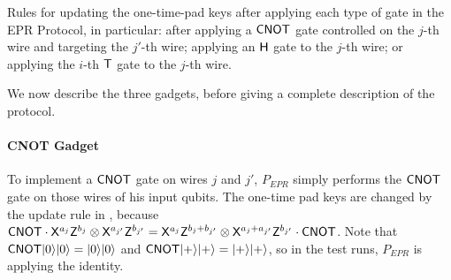 \documentclass{toc}
\newcommand{\ket}[1]{|#1\rangle}
\begin{document}
\begin{table}[H]

\caption{Rules for updating the one-time-pad keys after applying each type of gate in the EPR Protocol, in particular: after applying a $\sf CNOT$ gate controlled on the $j$-th wire and targeting the $j'$-th wire;  applying an $\sf H$ gate to the $j$-th wire; or applying the $i$-th $\sf T$ gate to the $j$-th wire. 
}\label{tab:EPR-key-updates}
\end{table}


We now describe the three gadgets, before giving a complete description of the protocol. 

\paragraph{CNOT Gadget} To implement a $\sf CNOT$ gate on wires $j$ and $j'$, $P_{EPR}$ simply performs the $\sf CNOT$ gate on those wires of his input qubits. The one-time pad keys are changed by the update rule in , because ${\sf CNOT}\cdot {\sf X}^{a_j}{\sf Z}^{b_j}\otimes {\sf X}^{a_{j'}}{\sf Z}^{b_{j'}}={\sf X}^{a_j}{\sf Z}^{b_j+b_{j'}}\otimes {\sf X}^{a_j+a_{j'}}{\sf Z}^{b_{j'}}\cdot {\sf CNOT}$. Note that ${\sf CNOT}\ket{0}\ket{0}=\ket{0}\ket{0}$ and ${\sf CNOT}\ket{+}\ket{+}=\ket{+}\ket{+}$, so in the test runs, $P_{EPR}$ is applying the identity. 
\end{document}

